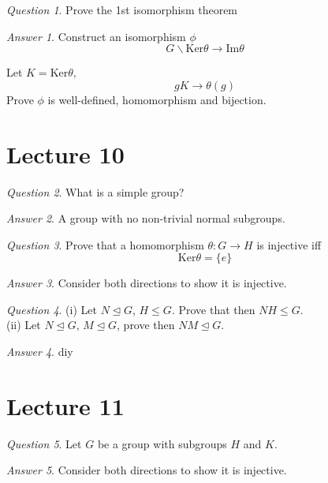 \documentclass[]{article}
\theoremstyle{remark}
\theoremstyle{qnstyle}
\newtheorem{question}{Question}
\theoremstyle{answerstyle}
\newtheorem*{answer}{Answer}
\begin{document}
\begin{question}
    Prove the 1st isomorphism theorem
\end{question}
\begin{answer}
    Construct an isomorphism $\phi$
    $$G \backslash \text{Ker}\theta \to \text{Im} \theta$$

    Let $K = \text{Ker}\theta,$ $$gK \to \theta(g)$$
    Prove $\phi$ is well-defined, homomorphism and bijection.
\end{answer}






\section*{Lecture 10}

\begin{question}
    What is a simple group?
\end{question}
\begin{answer}
    A group with no non-trivial normal subgroups.
\end{answer}

\begin{question}
    Prove that a homomorphism $\theta: G \to H$ is injective iff
        $$\text{Ker} \theta = \{ e \}$$
\end{question}
\begin{answer}
    Consider both directions to show it is injective.
\end{answer}


\begin{question}
    (i) Let $N \trianglelefteq G$, $H \leq G$. Prove that then $NH \leq G$. \\
    (ii) Let $N \trianglelefteq G$, $M \trianglelefteq G$, prove then $NM \trianglelefteq G$.
\end{question}
\begin{answer}
    diy
\end{answer}








\section* {Lecture 11}


\begin{question}
    Let $G$ be a group with subgroups $H$ and $K$. 
\end{question}
\begin{answer}
    Consider both directions to show it is injective.
\end{answer}
\end{document}
